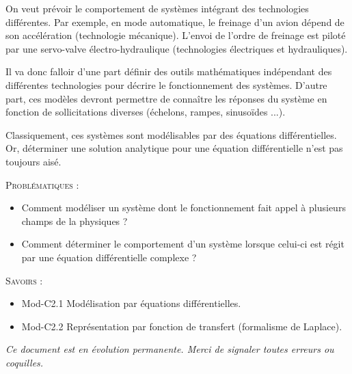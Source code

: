 \documentclass[11pt,oneside]{article}
\begin{document}
\vspace{.2cm}
On veut prévoir le comportement de systèmes intégrant des technologies différentes. Par exemple, en mode automatique, le freinage d'un avion dépend de son accélération (technologie mécanique). L'envoi de l'ordre de freinage est piloté par une servo-valve électro-hydraulique (technologies électriques et hydrauliques).

Il va donc falloir d'une part définir des outils mathématiques indépendant des différentes technologies pour décrire le fonctionnement des systèmes. D'autre part, ces modèles devront permettre de connaître les réponses du système en fonction de sollicitations diverses (échelons, rampes, sinusoïdes ...).


Classiquement, ces systèmes sont modélisables par des équations différentielles. Or, déterminer une solution analytique pour une équation différentielle n'est pas toujours aisé.

\begin{obj}
\textsc{Problématiques :}
\begin{itemize}
\item Comment modéliser un système dont le fonctionnement fait appel à plusieurs champs de la physiques ?
\item Comment déterminer le comportement d'un système lorsque celui-ci est régit par une équation différentielle complexe ?
\end{itemize}
\end{obj}

\begin{rem}
\textsc{Savoirs :}
\begin{itemize}
\item Mod-C2.1	Modélisation par équations différentielles.
\item Mod-C2.2	Représentation par fonction de transfert (formalisme de Laplace).
\end{itemize}
\end{rem}



\setlength{\parskip}{0ex plus 0.2ex minus 0ex}
 \renewcommand{\contentsname}{}
 \renewcommand{\baselinestretch}{1}

\textit{Ce document est en évolution permanente. Merci de signaler toutes
erreurs ou coquilles.}

\tableofcontents

 \renewcommand{\baselinestretch}{1.2}
\setlength{\parskip}{2ex plus 0.5ex minus 0.2ex}
\end{document}
